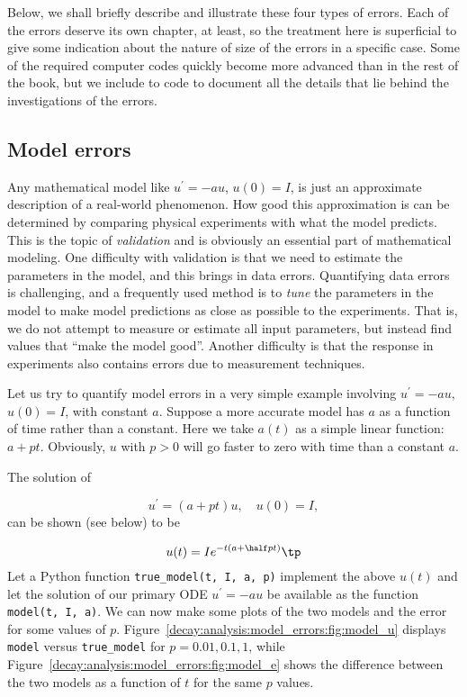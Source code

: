 \documentclass[graybox,sectrefs,envcountresetchap,open=right,final]{svmonodo}
\begin{document}
\noindent
Below, we shall briefly describe and illustrate these four types
of errors. Each of the errors deserve its own chapter, at least,
so the treatment here is superficial to give some indication
about the nature of size of the errors in a specific case.
Some of the required computer codes quickly become more advanced
than in the rest of the book, but we include to code to document
all the details that lie behind the investigations of the errors.

\subsection{Model errors}

Any mathematical model like $u^{\prime}=-au$, $u(0)=I$, is just an
approximate description of a real-world phenomenon. How good this
approximation is can be determined by comparing physical experiments
with what the model predicts. This is the topic of \emph{validation} and is
obviously an essential part of mathematical modeling. One difficulty with
validation is that we need to estimate the parameters in the model, and
this brings in data errors. Quantifying data errors is challenging,
and a frequently used method is to \emph{tune} the parameters in the model
to make model predictions as close as possible to the experiments.
That is, we do not attempt to measure or estimate all input
parameters, but instead find values that ``make the model good''.
Another difficulty is that the response in experiments also contains
errors due to measurement techniques.

Let us try to quantify model errors in a very simple example involving
$u^{\prime}=-au$, $u(0)=I$, with constant $a$.  Suppose a more
accurate model has $a$ as a function of time rather than a
constant. Here we take $a(t)$ as a simple linear function: $a +
pt$. Obviously, $u$ with $p>0$ will go faster to zero with time than a
constant $a$.

The solution of

\[ u^{\prime} = (a + pt)u,\quad u(0)=I,\]
can be shown (see below) to be

\[ u(t) = I e^{-t \left(a + \half pt\right)}\tp\]
Let a Python function \Verb!true_model(t, I, a, p)! implement the
above $u(t)$ and let
the solution of our primary ODE $u^{\prime}=-au$ be available as
the function \texttt{model(t, I, a)}.
We can now make some plots of the two models and the error for some values
of $p$. Figure~\ref{decay:analysis:model_errors:fig:model_u} displays
\texttt{model} versus \Verb!true_model! for $p=0.01, 0.1, 1$, while Figure~\ref{decay:analysis:model_errors:fig:model_e} shows the difference
between the two models as a function of $t$ for the same $p$ values.
\end{document}
